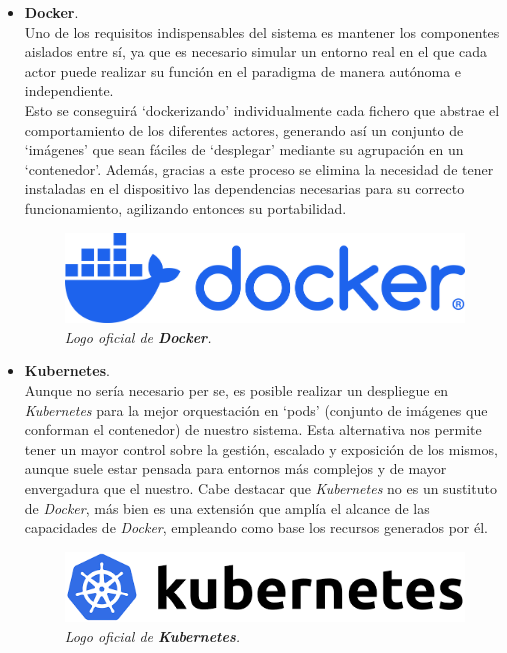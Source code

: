 \documentclass[../main.tex]{subfiles}
\begin{document}
\begin{itemize}
    \item \textbf{Docker}. \\ 
    Uno de los requisitos indispensables del sistema es mantener los componentes aislados entre sí, ya que es necesario simular un entorno real en el que cada actor puede realizar su función en el paradigma de manera autónoma e independiente.
    \\

    Esto se conseguirá `dockerizando' individualmente cada fichero que abstrae el comportamiento de los diferentes actores, generando así un conjunto de `imágenes' que sean fáciles de `desplegar' mediante su agrupación en un `contenedor'. Además, gracias a este proceso se elimina la necesidad de tener instaladas en el dispositivo las dependencias necesarias para su correcto funcionamiento, agilizando entonces su portabilidad.
    \\
    
    \begin{figure}[htbp]
        \centering
        \includegraphics[width=0.45\linewidth]{images/technologies/docker.png}
        \caption{\textit{Logo oficial de \textbf{Docker}.}}
    \end{figure}
  
    \item \textbf{Kubernetes}. \\ 
    Aunque no sería necesario per se, es posible realizar un despliegue en \textit{Kubernetes} para la mejor orquestación en `pods' (conjunto de imágenes que conforman el contenedor) de nuestro sistema. Esta alternativa nos permite tener un mayor control sobre la gestión, escalado y exposición de los mismos, aunque suele estar pensada para entornos más complejos y de mayor envergadura que el nuestro. Cabe destacar que \textit{Kubernetes} no es un sustituto de \textit{Docker}, más bien es una extensión que amplía el alcance de las capacidades de \textit{Docker}, empleando como base los recursos generados por él.
    \\
    
    \begin{figure}[htbp]
        \centering
        \includegraphics[width=0.45\linewidth]{images/technologies/kubernetes.png}
        \caption{\textit{Logo oficial de \textbf{Kubernetes}.}}
    \end{figure}


\end{itemize}
\end{document}

